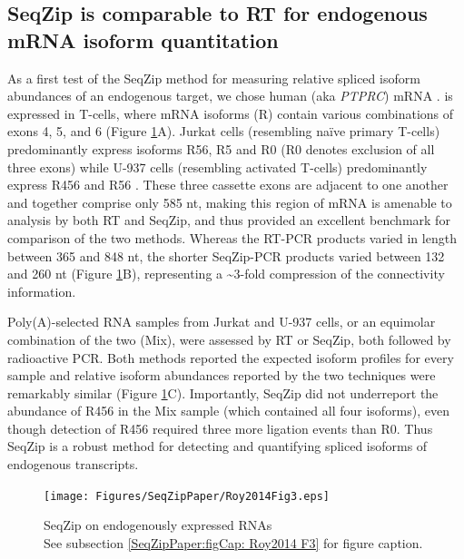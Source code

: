 	\subsection{SeqZip is comparable to RT for endogenous mRNA isoform quantitation}
		\label{SeqZipPaper:subsec: SeqZip comparable to RT}

		As a first test of the SeqZip method for measuring relative spliced isoform abundances of an endogenous target, we chose human \cd{} (aka \textit{PTPRC}) mRNA \citep{Zikherman2008}. \cd{} is expressed in T-cells, where mRNA isoforms (R) contain various combinations of exons 4, 5, and 6 (Figure \ref{SeqZipPaper:fig:Roy2014 F3}A). Jurkat cells (resembling naïve primary T-cells) predominantly express isoforms R56, R5 and R0 (R0 denotes exclusion of all three exons) while U-937 cells (resembling activated T-cells) predominantly express R456 and R56 \citep{Yeakley2002}. These three cassette exons are adjacent to one another and together comprise only 585 nt, making this region of \cd{} mRNA is amenable to analysis by both RT and SeqZip, and thus provided an excellent benchmark for comparison of the two methods. Whereas the RT-PCR products varied in length between 365 and 848 nt, the shorter SeqZip-PCR products varied between 132 and 260 nt (Figure \ref{SeqZipPaper:fig:Roy2014 F3}B), representing a \textasciitilde 3-fold compression of the connectivity information.

		Poly(A)-selected RNA samples from Jurkat and U-937 cells, or an equimolar combination of the two (Mix), were assessed by RT or SeqZip, both followed by radioactive PCR. Both methods reported the expected isoform profiles for every sample and relative isoform abundances reported by the two techniques were remarkably similar (Figure \ref{SeqZipPaper:fig:Roy2014 F3}C). Importantly, SeqZip did not underreport the abundance of R456 in the Mix sample (which contained all four isoforms), even though detection of R456 required three more ligation events than R0. Thus SeqZip is a robust method for detecting and quantifying spliced isoforms of endogenous transcripts. 

		\begin{figure} %
			\centering 
			\texttt{[image: Figures/SeqZipPaper/Roy2014Fig3.eps]}
			\caption[SeqZip on endogenously expressed RNAs]
			{
				SeqZip on endogenously expressed RNAs\\[0.25cm]
				See subsection \ref{SeqZipPaper:figCap: Roy2014 F3} for figure caption.
				}
			\label{SeqZipPaper:fig:Roy2014 F3}
			\end{figure}

